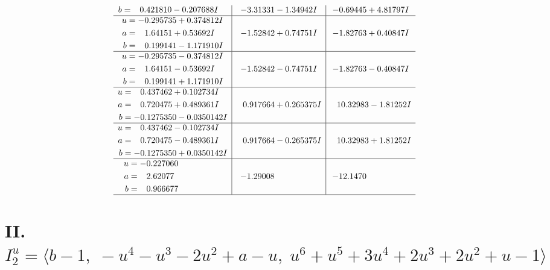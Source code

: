 \documentclass[1p]{elsarticle_modified}
\theoremstyle{definition}
\begin{document}
$$\begin{array}{c|c|c}
\begin{aligned}
b &= \phantom{-}0.421810 - 0.207688 I\end{aligned}
 & -3.31331 - 1.34942 I & -0.69445 + 4.81797 I \\ \hline\begin{aligned}
u &= -0.295735 + 0.374812 I \\
a &= \phantom{-}1.64151 + 0.53692 I \\
b &= \phantom{-}0.199141 - 1.171910 I\end{aligned}
 & -1.52842 + 0.74751 I & -1.82763 + 0.40847 I \\ \hline\begin{aligned}
u &= -0.295735 - 0.374812 I \\
a &= \phantom{-}1.64151 - 0.53692 I \\
b &= \phantom{-}0.199141 + 1.171910 I\end{aligned}
 & -1.52842 - 0.74751 I & -1.82763 - 0.40847 I \\ \hline\begin{aligned}
u &= \phantom{-}0.437462 + 0.102734 I \\
a &= \phantom{-}0.720475 + 0.489361 I \\
b &= -0.1275350 - 0.0350142 I\end{aligned}
 & \phantom{-}0.917664 + 0.265375 I & \phantom{-}10.32983 - 1.81252 I \\ \hline\begin{aligned}
u &= \phantom{-}0.437462 - 0.102734 I \\
a &= \phantom{-}0.720475 - 0.489361 I \\
b &= -0.1275350 + 0.0350142 I\end{aligned}
 & \phantom{-}0.917664 - 0.265375 I & \phantom{-}10.32983 + 1.81252 I \\ \hline\begin{aligned}
u &= -0.227060\phantom{ +0.000000I} \\
a &= \phantom{-}2.62077\phantom{ +0.000000I} \\
b &= \phantom{-}0.966677\phantom{ +0.000000I}\end{aligned}
 & -1.29008\phantom{ +0.000000I} & -12.1470\phantom{ +0.000000I}\\
 \hline 
 \end{array}$$\newpage\newpage\renewcommand{\arraystretch}{1}
\centering \section*{II. $I^u_{2}= \langle b-1,\;- u^4- u^3-2 u^2+a- u,\;u^6+u^5+3 u^4+2 u^3+2 u^2+u-1 \rangle$}
\end{document}
